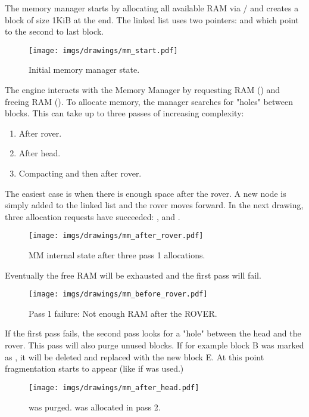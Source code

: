 \documentclass[book.tex]{subfiles}
\begin{document}
The memory manager starts by allocating all available RAM via / and creates a  block of size 1KiB at the end. The linked list uses two pointers:  and  which point to the second to last block.
 \par
\begin{figure}[H]
\centering
 \texttt{[image: imgs/drawings/mm\_start.pdf]}
 \caption{Initial memory manager state.}
 \end{figure}
 \par
 The engine interacts with the Memory Manager by requesting RAM () and freeing RAM (). To allocate memory, the manager searches for "holes" between blocks. This can take up to three passes of increasing complexity:
\begin{enumerate}
\item After rover.
\item After head.
\item Compacting and then after rover.
\end{enumerate}
\par
  The easiest case is when there is enough space after the rover. A new node is simply added to the linked list and the rover moves forward. In the next drawing, three allocation requests have succeeded: ,  and .\\
  \par
\begin{figure}[H]
\centering
 \texttt{[image: imgs/drawings/mm\_after\_rover.pdf]}
 \caption{MM internal state after three pass 1 allocations.}
 \end{figure}
 \par
Eventually the free RAM will be exhausted and the first pass will fail.
  \par
\begin{figure}[H]
\centering
 \texttt{[image: imgs/drawings/mm\_before\_rover.pdf]}
 \caption{Pass 1 failure: Not enough RAM after the ROVER.}
 \end{figure}
 \par
 If the first pass fails, the second pass looks for a "hole" between the head and the rover. This pass will also purge unused blocks. If for example block B was marked as , it will be deleted and replaced with the new block E. At this point fragmentation starts to appear (like if  was used.)\\
 \begin{figure}[H]
\centering
 \texttt{[image: imgs/drawings/mm\_after\_head.pdf]}
 \caption{ was purged.  was allocated in pass 2.}
 \end{figure}
\end{document}
